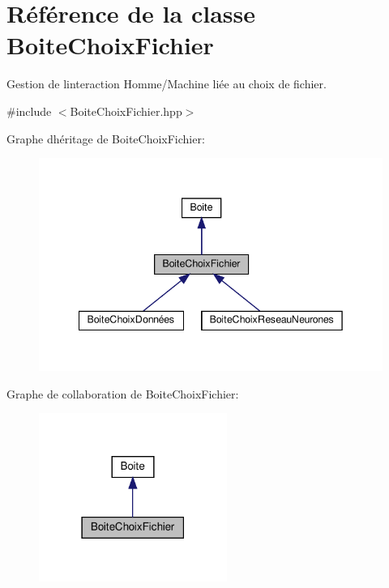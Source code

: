 \hypertarget{class_boite_choix_fichier}{}\section{Référence de la classe Boite\+Choix\+Fichier}
\label{class_boite_choix_fichier}


Gestion de l\textquotesingle{}interaction Homme/\+Machine liée au choix de fichier.  




{\ttfamily \#include $<$Boite\+Choix\+Fichier.\+hpp$>$}



Graphe d\textquotesingle{}héritage de Boite\+Choix\+Fichier\+:\nopagebreak
\begin{figure}[H]
\begin{center}
\leavevmode
\includegraphics[width=342pt]{class_boite_choix_fichier__inherit__graph}
\end{center}
\end{figure}


Graphe de collaboration de Boite\+Choix\+Fichier\+:\nopagebreak
\begin{figure}[H]
\begin{center}
\leavevmode
\includegraphics[width=174pt]{class_boite_choix_fichier__coll__graph}
\end{center}
\end{figure}

